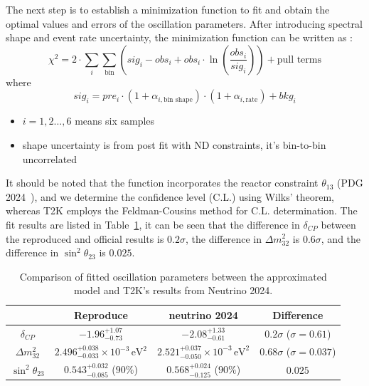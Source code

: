 The next step is to establish a minimization function to fit and obtain the optimal values and errors of the oscillation parameters. After introducing spectral shape and event rate uncertainty, the minimization function can be written as :
\begin{equation}
    \chi^2 = 2 \cdot \sum_{i} \sum_{\text{bin}} \left( sig_i - obs_i + obs_i \cdot \ln\left( \frac{obs_i}{sig_i} \right) \right) + \text{pull terms}
    \end{equation}
    where 
    \[
    sig_i = pre_i \cdot (1 + \alpha_{i,\text{bin shape}}) \cdot (1 + \alpha_{i,\text{rate}}) + bkg_i
    \]
\begin{itemize}
    \item $i=1,2\ldots,6$ means six samples  
    \item shape uncertainty is from post fit with ND constraints, it's bin-to-bin uncorrelated  
\end{itemize}
It should be noted that the function incorporates the reactor constraint $\theta_{13}$ (PDG 2024~\cite{ParticleDataGroup:2024cfk}), and we determine the confidence level (C.L.) using Wilks' theorem, whereas T2K employs the Feldman-Cousins method for C.L. determination. The fit results are listed in Table~\ref{tab:t2k_params}, it can be seen that the difference in \(\delta_{CP}\) between the reproduced and official results is \(0.2\sigma\), the difference in \(\Delta m^2_{32}\) is \(0.6\sigma\), and the difference in \(\sin^2\theta_{23}\) is \(0.025\).
\begin{table}[!ht]
\centering
\begin{tabular}{cccc}
\toprule
 & Reproduce & neutrino 2024 & Difference \\
\midrule
$\delta_{CP}$ 
  & $-1.96_{-0.73}^{+1.07}$ 
  & $-2.08_{-0.61}^{+1.33}$ 
  & $0.2\sigma$ ($\sigma=0.61$) \\

$\Delta m^2_{32}$ 
  & $2.496_{-0.033}^{+0.038} \times 10^{-3}\,\text{eV}^2$ 
  & $2.521_{-0.050}^{+0.037} \times 10^{-3}\,\text{eV}^2$ 
  & $0.68\sigma$ ($\sigma=0.037$) \\

$\sin^2\theta_{23}$ 
  & $0.543_{-0.085}^{+0.032}$ ($90\%$) 
  & $0.568_{-0.125}^{+0.024}$ ($90\%$) 
  & $0.025$ \\
\bottomrule
\end{tabular}
\caption{Comparison of fitted oscillation parameters between the approximated model and T2K's results from Neutrino 2024.}
\label{tab:t2k_params}
\end{table}

